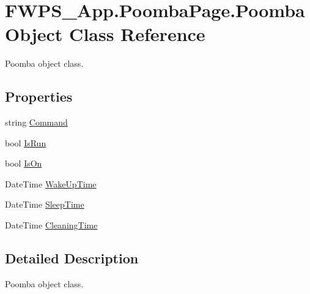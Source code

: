 \hypertarget{class_f_w_p_s___app_1_1_poomba_page_1_1_poomba_object}{}\section{F\+W\+P\+S\+\_\+\+App.\+Poomba\+Page.\+Poomba\+Object Class Reference}
\label{class_f_w_p_s___app_1_1_poomba_page_1_1_poomba_object}


Poomba object class.  


\subsection*{Properties}
\begin{DoxyCompactItemize}
\item 
string \mbox{\hyperlink{class_f_w_p_s___app_1_1_poomba_page_1_1_poomba_object_ac141c2dfb920e33a15050840ce4254d7}{Command}}
\item 
bool \mbox{\hyperlink{class_f_w_p_s___app_1_1_poomba_page_1_1_poomba_object_a387d08dbd78280d19998cdbb252d9437}{Is\+Run}}
\item 
bool \mbox{\hyperlink{class_f_w_p_s___app_1_1_poomba_page_1_1_poomba_object_a3616d9426719d23a43b2c26e523e6369}{Is\+On}}
\item 
Date\+Time \mbox{\hyperlink{class_f_w_p_s___app_1_1_poomba_page_1_1_poomba_object_acac9138a239e0d59e57e01be46d7ea3b}{Wake\+Up\+Time}}
\item 
Date\+Time \mbox{\hyperlink{class_f_w_p_s___app_1_1_poomba_page_1_1_poomba_object_a3c24ac3c1c2312ca5638fccadeba4298}{Sleep\+Time}}
\item 
Date\+Time \mbox{\hyperlink{class_f_w_p_s___app_1_1_poomba_page_1_1_poomba_object_a44bac55c984330ea3ae7661bba85a6d5}{Cleaning\+Time}}
\end{DoxyCompactItemize}


\subsection{Detailed Description}
Poomba object class. 

